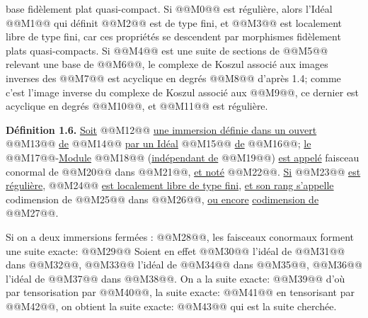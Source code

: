 
base fidèlement plat quasi-compact. Si @@M0@@ est régulière, alors l'Idéal @@M1@@ qui définit @@M2@@ est de type fini, et @@M3@@ est localement libre de type fini, car ces propriétés se descendent par morphismes fidèlement plats quasi-compacts. Si @@M4@@ est une suite de sections de @@M5@@ relevant une base de @@M6@@, le complexe de Koszul associé aux images inverses des @@M7@@ est acyclique en degrés @@M8@@ d'après 1.4; comme c'est l'image inverse du complexe de Koszul associé aux @@M9@@, ce dernier est acyclique en degrés @@M10@@, et @@M11@@ est régulière.

\textbf{Définition 1.6.} \uline{Soit} @@M12@@ \uline{une immersion définie dans un ouvert} @@M13@@ \uline{de} @@M14@@ \uline{par un Idéal} @@M15@@ \uline{de} @@M16@@; \uline{le} @@M17@@-\uline{Module} @@M18@@ (\uline{indépendant de} @@M19@@) \uline{est appelé} faisceau conormal de @@M20@@ dans @@M21@@, \uline{et noté} @@M22@@. \uline{Si} @@M23@@ \uline{est régulière}, @@M24@@ \uline{est localement libre de type fini}, \uline{et son rang s'appelle} codimension de @@M25@@ dans @@M26@@, \uline{ou encore} \uline{codimension de} @@M27@@.

Si on a deux immersions fermées : @@M28@@, les faisceaux conormaux forment une suite exacte:
@@M29@@
Soient en effet @@M30@@ l'idéal de @@M31@@ dans @@M32@@, @@M33@@ l'idéal de @@M34@@ dans @@M35@@, @@M36@@ l'idéal de @@M37@@ dans @@M38@@. On a la suite exacte:
@@M39@@
d'où par tensorisation par @@M40@@, la suite exacte:
@@M41@@
en tensorisant par @@M42@@, on obtient la suite exacte:
@@M43@@
qui est la suite cherchée.

